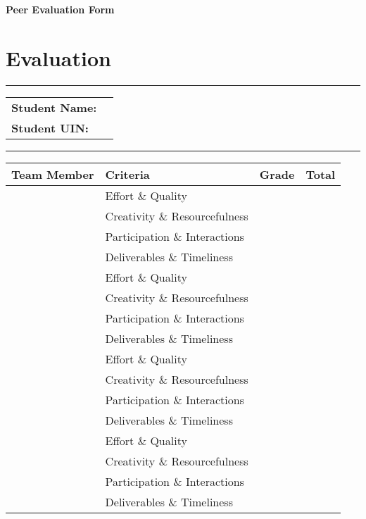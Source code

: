 \documentclass[11pt]{article}
\begin{document}
\begin{center}
{\bfseries \LARGE Peer Evaluation Form}
\end{center}


\section*{Evaluation}

\noindent
\rule[1mm]{\linewidth}{0.2pt}
\begin{center}
\begin{tabular}{p{0.9\linewidth}}
\textbf{Student Name:}\\
\textbf{Student UIN:}
\end{tabular}
\end{center}
\rule[1mm]{\linewidth}{0.2pt}

\begin{center}
\begin{tabular}{|p{4cm}|p{6cm}|p{2cm}|p{2cm}|}
\hline
\textbf{Team Member} & \textbf{Criteria} & \textbf{Grade} & \textbf{Total} \\
\hline
& Effort \& Quality & & \\
& Creativity \& Resourcefulness & & \\
& Participation \& Interactions & & \\
& Deliverables \& Timeliness & & \\
\hline
\hline
& Effort \& Quality & & \\
& Creativity \& Resourcefulness & & \\
& Participation \& Interactions & & \\
& Deliverables \& Timeliness & & \\
\hline
\hline
& Effort \& Quality & & \\
& Creativity \& Resourcefulness & & \\
& Participation \& Interactions & & \\
& Deliverables \& Timeliness & & \\
\hline
& Effort \& Quality & & \\
& Creativity \& Resourcefulness & & \\
& Participation \& Interactions & & \\
& Deliverables \& Timeliness & & \\
\hline
\end{tabular}
\end{center}
\end{document}
